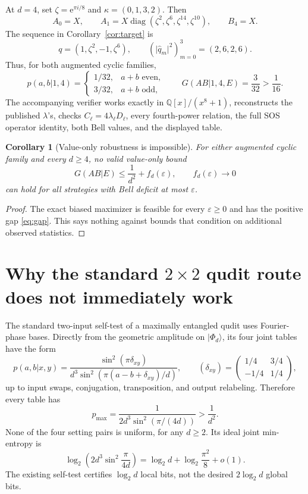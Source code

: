 \documentclass[11pt]{article}
\newtheorem{corollary}[theorem]{Corollary}
\theoremstyle{remark}
\newcommand{\e}{\mathrm e}
\newcommand{\absop}[1]{\lvert #1\rvert}
\begin{document}
At \(d=4\), set \(\zeta=\e^{\pi i/8}\) and
\(\kappa=(0,1,3,2)\).  Then
\[
A_0=X,\qquad
A_1=X\operatorname{diag}
(\zeta^2,\zeta^6,\zeta^{14},\zeta^{10}),
\qquad B_4=X.
\]
The sequence in Corollary~\ref{cor:target} is
\[
q=(1,\zeta^2,-1,\zeta^6),
\qquad
\left(\absop{\widehat q_m}^2\right)_{m=0}^3=(2,6,2,6).
\]
Thus, for both augmented cyclic families,
\[
p(a,b|1,4)=
\begin{cases}
1/32,&a+b\text{ even},\\
3/32,&a+b\text{ odd},
\end{cases}
\qquad
G(AB|1,4,E)=\frac3{32}>\frac1{16}.
\]
The accompanying verifier works exactly in
\(\mathbb Q[x]/(x^8+1)\), reconstructs the published \(\lambda\)'s, checks
\(C_\ell=4\lambda_\ell D_\ell\), every fourth-power relation, the full SOS
operator identity, both Bell values, and the displayed table.

\begin{corollary}[Value-only robustness is impossible]
For either augmented cyclic family and every \(d\geq4\), no valid
value-only bound
\[
G(AB|E)\leq\frac1{d^2}+f_d(\varepsilon),
\qquad f_d(\varepsilon)\longrightarrow0
\]
can hold for all strategies with Bell deficit at most \(\varepsilon\).
\end{corollary}

\begin{proof}
The exact biased maximizer is feasible for every \(\varepsilon\geq0\) and
has the positive gap \eqref{eq:gap}.  This says nothing against bounds that
condition on additional observed statistics.
\end{proof}

\section{Why the standard
\texorpdfstring{\(2\times2\)}{2 x 2} qudit route does not immediately work}

The standard two-input self-test of a maximally entangled qudit
\cite{SarkarEtAl2021} uses Fourier-phase bases.  Directly from the geometric
amplitude on \(\lvert\Phi_d\rangle\), its four joint tables have the form
\begin{equation}
p(a,b|x,y)
=
\frac{\sin^2(\pi\delta_{xy})}
{d^3\sin^2(\pi(a-b+\delta_{xy})/d)},
\qquad
(\delta_{xy})=
\begin{pmatrix}
1/4&3/4\\
-1/4&1/4
\end{pmatrix},
\label{eq:satwap-table}
\end{equation}
up to input swaps, conjugation, transposition, and output relabeling.
Therefore every table has
\[
p_{\max}
=
\frac1{2d^3\sin^2(\pi/(4d))}
>\frac1{d^2}.
\]
None of the four setting pairs is uniform, for any \(d\geq2\).  Its ideal
joint min-entropy is
\[
\log_2\!\left(2d^3\sin^2\frac{\pi}{4d}\right)
=\log_2d+\log_2\frac{\pi^2}{8}+o(1).
\]
The existing self-test certifies \(\log_2d\) local bits, not the desired
\(2\log_2d\) global bits.
\end{document}
